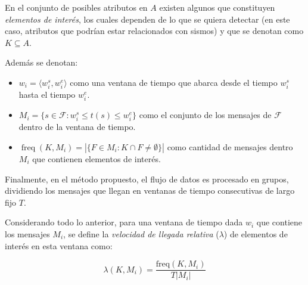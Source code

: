 En el conjunto de posibles atributos en $A$ existen algunos que constituyen \emph{elementos de interés}, los cuales dependen de lo que se quiera detectar (en este caso, atributos que podrían estar relacionados con sismos) y que se denotan como $K \subseteq A$.

Además se denotan:
\begin{itemize}
	\item $w_i = \langle w^s_i, w^e_i \rangle$ como una ventana de tiempo que abarca desde el tiempo $w^s_i$ hasta el tiempo $w^e_i$.
 	\item $M_i = \{ s \in {\mathcal F}: w^s_i \le t(s) \le w^e_i \}$ como el conjunto de los mensajes de ${\mathcal F}$ dentro de la ventana de tiempo. 
	\item $\operatorname{freq}(K, M_i) = | \{ F \in M_i: K \cap F \neq \emptyset \} |$ como cantidad de mensajes dentro $M_i$ que contienen elementos de interés.
\end{itemize}

Finalmente, en el método propuesto, el flujo de datos es procesado en grupos, dividiendo los mensajes que llegan en ventanas de tiempo consecutivas de largo fijo $T$.

Considerando todo lo anterior, para una ventana de tiempo dada $w_i$ que contiene los mensajes $M_i$, se define la \emph{velocidad de llegada relativa} ($\lambda$) de elementos de interés en esta ventana como:

\begin{equation}
\label{eq:lambda}
\lambda(K, M_i) = \frac{\mathrm{freq}(K,M_i)}{T|M_i|}
\end{equation}


